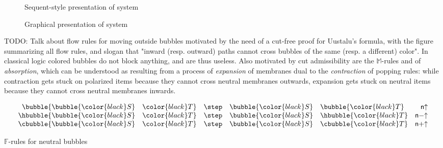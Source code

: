 \begin{figure*}
  
  \caption{Sequent-style presentation of system }
\end{figure*}

\begin{figure*}
  
  \caption{Graphical presentation of system }
\end{figure*}


TODO: Talk about flow rules for moving outside bubbles motivated by the need of
a cut-free proof for Uustalu's formula, with the figure summarizing all flow
rules, and slogan that "inward (resp. outward) paths cannot cross bubbles of the
same (resp. a different) color". In classical logic colored bubbles do not block
anything, and are thus useless. Also motivated by cut admissibility are the
$\mathbb{M}$-rules {} and {} of \emph{absorption}, which
can be understood as resulting from a process of \emph{expansion} of membranes
dual to the \emph{contraction} of popping rules: while contraction gets stuck on
polarized items because they cannot cross neutral membranes outwards, expansion
gets stuck on neutral items because they cannot cross neutral membranes
inwards.

\begin{marginfigure}
  $$
  \begin{array}{rclr}
    \bubble{\bubble{\color{black}S}~~~\color{black}T} &\step &\bubble{\color{black}S}~~~\bubble{\color{black}T} &\mathsf{n{\uparrow}} \\
    \hbubble{\bubble{\color{black}S}~~~\color{black}T} &\step &\bubble{\color{black}S}~~~\hbubble{\color{black}T} &\mathsf{n{-}{\uparrow}} \\
    \cbubble{\bubble{\color{black}S}~~~\color{black}T} &\step &\bubble{\color{black}S}~~~\cbubble{\color{black}T} &\mathsf{n{+}{\uparrow}} \\
  \end{array} 
  $$
  \caption{$\mathbb{F}$-rules for neutral bubbles}
\end{marginfigure}

